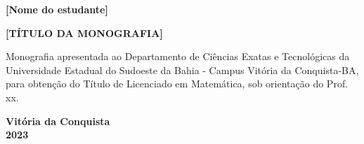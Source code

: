 \begin{titlepage}

\begin{center}
\textbf{[Nome do estudante]\\}
\vspace{7,5cm}

		\textbf{[TÍTULO DA MONOGRAFIA]}\\

\vspace{2.5cm}

\vspace{2cm}
\begin{flushright}
    \begin{minipage}[l]{8cm} \justifying
        \noindent Monografia apresentada ao Departamento de Ci\^encias Exatas e Tecnol\'ogicas da Universidade Estadual do Sudoeste da Bahia - Campus Vit\'oria da Conquista-BA, para obten\c c\~ao do T\'itulo de Licenciado em Matem\'atica, sob orienta\c c\~ao do Prof. xx.
    \end{minipage}
\end{flushright}

\end{center}

\vfill
\centering
		
			\textbf{Vit\'oria da Conquista \\2023}

\end{titlepage}
